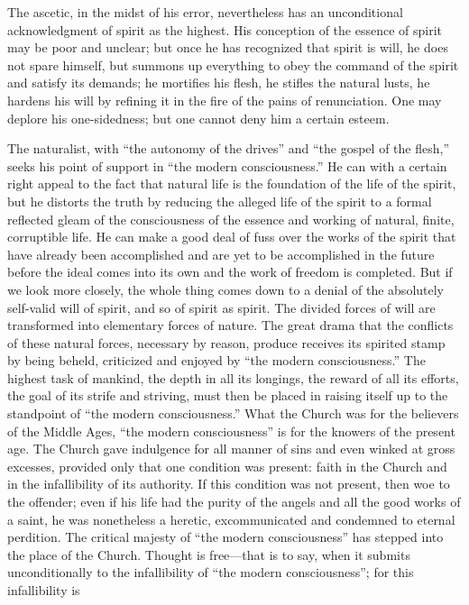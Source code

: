 \documentclass[12pt,a4paper,openany]{book}
\newcommand{\opage}[1]{\marginnote{\footnotesize\textit{[#1]}}}
\begin{document}
The ascetic, in the midst of his error, nevertheless has an unconditional
acknowledgment of spirit as the highest. His conception of the essence of
spirit may be poor and unclear; but once he has recognized that spirit is
will, he does not spare himself, but summons up everything to obey the
command of the spirit and satisfy its demands; he mortifies his flesh, he
stifles the natural lusts, he hardens his will by refining it in the fire
of the pains of renunciation. One may deplore his one-sidedness; but one
cannot deny him a certain esteem.

The naturalist, with ``the autonomy of the drives'' and ``the gospel of
the flesh,'' seeks his point of support in ``the modern consciousness.''
He can with a certain right appeal to the fact that natural life is the
foundation of the life of the spirit, but he distorts the truth by
reducing the alleged life of the spirit to a formal reflected gleam of
the consciousness of the essence and working of natural, finite,
corruptible life. He can make a good deal of fuss over the works of the
spirit that have already been accomplished and are yet to be accomplished
in the future before the ideal comes \opage{93}into its own and the work of freedom
is completed. But if we look more closely, the whole thing comes down to
a denial of the absolutely self-valid will of spirit, and so of spirit as
spirit. The divided forces of will are transformed into elementary forces
of nature. The great drama that the conflicts of these natural forces,
necessary by reason, produce receives its spirited stamp by being
beheld, criticized and enjoyed by ``the modern consciousness.'' The highest
task of mankind, the depth in all its longings, the reward of all its
efforts, the goal of its strife and striving, must then be placed in
raising itself up to the standpoint of ``the modern consciousness.'' What
the Church was for the believers of the Middle Ages, ``the modern
consciousness'' is for the knowers of the present age. The Church gave
indulgence for all manner of sins and even winked at gross excesses,
provided only that one condition was present: faith in the Church and in
the infallibility of its authority. If this condition was not present,
then woe to the offender; even if his life had the purity of the angels
and all the good works of a saint, he was nonetheless a heretic,
excommunicated and condemned to eternal perdition. The critical majesty
of ``the modern consciousness'' has stepped into the place of the Church.
Thought is free---that is to say, when it submits unconditionally to the
infallibility of ``the modern consciousness''; for this infallibility is
\end{document}

